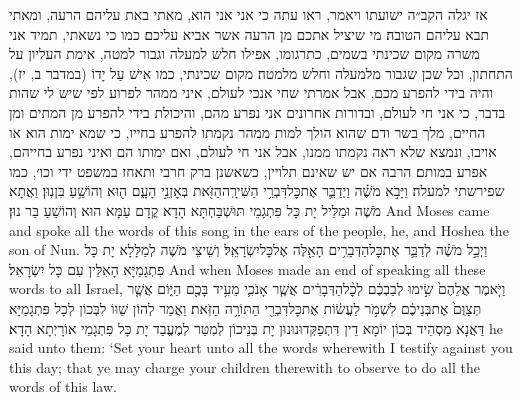 {\quad {} אז יגלה הקב״ה ישועתו ויאמר, ראו עתה כי אני אני הוא, מאתי באת עליהם הרעה, ומאתי תבא עליהם הטובה׃ \quad {} מי שיציל אתכם מן הרעה אשר אביא עליכם׃\quad {} כמו כי נשאתי, תמיד אני משרה מקום שכינתי בשמים, כתרגומו, אפילו חלש למעלה וגבור למטה, אימת העליון על התחתון, וכל שכן שגבור מלמעלה וחלש מלמטה׃ \quad {} מקום שכינתי, כמו אִישׁ עַל יָדוֹ (במדבר ב, יז), והיה בידי להפרע מכם, אבל אמרתי שחי אנכי לעולם, איני ממהר לפרוע לפי שיש לי שהות בדבר, כי אני חי לעולם, ובדורות אחרונים אני נפרע מהם, והיכולת בידי להפרע מן המתים ומן החיים, מלך בשר ודם שהוא הולך למות ממהר נקמתו להפרע בחייו, כי שמא ימות הוא או אויבו, ונמצא שלא ראה נקמתו ממנו, אבל אני חי לעולם, ואם ימותו הם ואיני נפרע בחייהם, אפרע במותם׃ \quad {} הרבה אם יש שאינם תלויין, כשאשנן ברק חרבי ותאחז במשפט ידי וכו׳, כמו שפירשתי למעלה׃ }
{וַיָּבֹ֣א מֹשֶׁ֗ה וַיְדַבֵּ֛ר אֶת\maqqaf כׇּל\maqqaf דִּבְרֵ֥י הַשִּׁירָֽה\maqqaf הַזֹּ֖את בְּאׇזְנֵ֣י הָעָ֑ם ה֖וּא וְהוֹשֵׁ֥עַ בִּן\maqqaf נֽוּן׃}
{וַאֲתָא מֹשֶׁה וּמַלֵּיל יָת כָּל פִּתְגָמֵי תּוּשְׁבַּחְתָּא הָדָא קֳדָם עַמָּא הוּא וְהוֹשֵׁעַ בַּר נוּן׃}
{And Moses came and spoke all the words of this song in the ears of the people, he, and Hoshea the son of Nun.}{}
{וַיְכַ֣ל מֹשֶׁ֗ה לְדַבֵּ֛ר אֶת\maqqaf כׇּל\maqqaf הַדְּבָרִ֥ים הָאֵ֖לֶּה אֶל\maqqaf כׇּל\maqqaf יִשְׂרָאֵֽל׃}
{וְשֵׁיצֵי מֹשֶׁה לְמַלָּלָא יָת כָּל פִּתְגָמַיָּא הָאִלֵּין עִם כָּל יִשְׂרָאֵל׃}
{And when Moses made an end of speaking all these words to all Israel,}{}
{וַיֹּ֤אמֶר אֲלֵהֶם֙ שִׂ֣ימוּ לְבַבְכֶ֔ם לְכׇ֨ל\maqqaf הַדְּבָרִ֔ים אֲשֶׁ֧ר אָנֹכִ֛י מֵעִ֥יד בָּכֶ֖ם הַיּ֑וֹם אֲשֶׁ֤ר תְּצַוֻּם֙ אֶת\maqqaf בְּנֵיכֶ֔ם לִשְׁמֹ֣ר לַעֲשׂ֔וֹת אֶת\maqqaf כׇּל\maqqaf דִּבְרֵ֖י הַתּוֹרָ֥ה הַזֹּֽאת׃}
{וַאֲמַר לְהוֹן שַׁוּוֹ לִבְּכוֹן לְכָל פִּתְגָמַיָּא דַּאֲנָא מַסְהֵיד בְּכוֹן יוֹמָא דֵין דִּתְפַקְּדוּנוּנוּן יָת בְּנֵיכוֹן לְמִטַּר לְמֶעֱבַד יָת כָּל פִּתְגָמֵי אוֹרָיְתָא הָדָא׃}
{he said unto them: ‘Set your heart unto all the words wherewith I testify against you this day; that ye may charge your children therewith to observe to do all the words of this law.}{}
